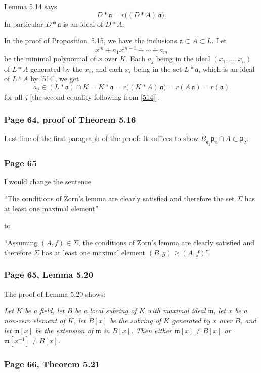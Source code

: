 \documentclass[12pt,letterpaper]{article}%
\newcommand{\mf}{\mathfrak}
\newcommand{\aaa}{\mf a}
\newcommand{\mmm}{\mf m}
\newcommand{\ppp}{\mf p}
\newcommand{\qqq}{\mf q}
\newcommand{\nn}{\noindent}
\begin{document}
Lemma 5.14 says
\begin{equation}\label{514}
D*\aaa=r\Big((D*A)\,\aaa\Big).
\end{equation}
In particular $D*\aaa$ is an ideal of $D*A$. 

In the proof of Proposition~5.15, we have the inclusions $\aaa\subset A\subset L$. Let 
$$
x^m+a_1x^{m-1}+\cdots+a_m
$$ 
be the minimal polynomial of $x$ over $K$. Each $a_j$ being in the ideal $(x_1,\dots,x_n)$ of $L*A$ generated by the $x_i$, and each $x_i$ being in the set $L*\aaa$, which is an ideal of $L*A$ by \eqref{514}, we get 
$$
a_j\in(L*\aaa)\cap K=K*\aaa=r\Big((K*A)\,\aaa\Big)=r(A\,\aaa)=r(\aaa)
$$ 
for all $j$ [the second equality following from \eqref{514}].

\subsubsection{Page 64, proof of Theorem 5.16}%

Last line of the first paragraph of the proof: It suffices to show $B_{\qqq_1}\ppp_2\cap A\subset\ppp_2$.

\subsubsection{Page 65}\label{65}%

I would change the sentence

``The conditions of Zorn's lemma are clearly satisfied and therefore the set $\Sigma$ has at least one maximal element''

\nn to 

``Assuming $(A,f)\in\Sigma$, the conditions of Zorn's lemma are clearly satisfied and therefore $\Sigma$ has at least one maximal element $(B,g)\ge(A,f)$''.

\subsubsection{Page 65, Lemma 5.20}\label{L5.20}%

The proof of Lemma 5.20 shows:

\nn\emph{Let $K$ be a field, let $B$ be a local subring of $K$ with maximal ideal $\mmm$, let $x$ be a non-zero element of $K$, let $B[x]$ be the subring of $K$ generated by $x$ over $B$, and let $\mmm[x]$ be the extension of $\mmm$ in $B[x]$. Then either $\mmm[x]\ne B[x]$ or $\mmm[x^{-1}]\ne B[x]$.}

\subsubsection{Page 66, Theorem 5.21}%
\end{document}
